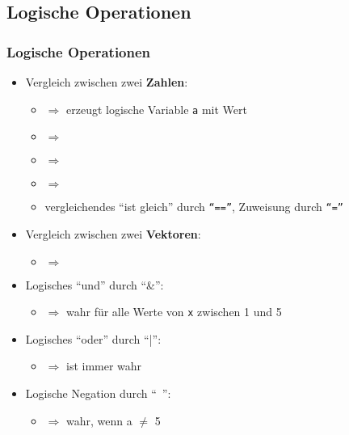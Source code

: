       \subsection{Logische Operationen}
      \begin{frame}
          \frametitle{Logische Operationen}
          \begin{itemize}
            \item Vergleich zwischen zwei \textbf{Zahlen}:
            \begin{itemize}
              \item {} $\Rightarrow$ erzeugt logische Variable \texttt{a} mit Wert 
              \item {} $\Rightarrow$ 
              \item {} $\Rightarrow$ 
              \item {} $\Rightarrow$ 
              \item vergleichendes ``ist gleich'' durch \texttt{``==''}, Zuweisung durch \texttt{``=''}
            \end{itemize}
            \item Vergleich zwischen zwei \textbf{Vektoren}:
            \begin{itemize}
              \item \matlabInput{[1:4]<[5:-2:-1]} $\Rightarrow$ 
            \end{itemize}
            \item Logisches ``und'' durch ``\string&'':
            \begin{itemize}
              \item {} $\Rightarrow$ wahr für alle Werte von \texttt{x} zwischen 1 und 5
            \end{itemize}
            \item Logisches ``oder'' durch ``\string|'':
            \begin{itemize}
              \item {} $\Rightarrow$ ist immer wahr
            \end{itemize}
            \item Logische Negation durch ``\string~'':
            \begin{itemize}
              \item {} $\Rightarrow$ wahr, wenn a $\neq$ 5
            \end{itemize}
          \end{itemize}
      \end{frame}


